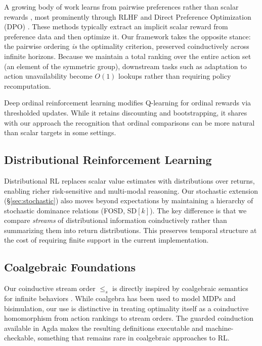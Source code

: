 \documentclass[runningheads]{llncs}
\begin{document}
A growing body of work learns from pairwise preferences rather than scalar rewards \cite{Wirth2017}, most prominently through RLHF and Direct Preference Optimization (DPO) \cite{Rafailov2023}.  These methods typically extract an implicit scalar reward from preference data and then optimize it.  Our framework takes the opposite stance: the pairwise ordering \emph{is} the optimality criterion, preserved coinductively across infinite horizons.  Because we maintain a total ranking over the entire action set (an element of the symmetric group), downstream tasks such as adaptation to action unavailability become $O(1)$ lookups rather than requiring policy recomputation.

Deep ordinal reinforcement learning \cite{Zap2019} modifies Q-learning for ordinal rewards via thresholded updates.  While it retains discounting and bootstrapping, it shares with our approach the recognition that ordinal comparisons can be more natural than scalar targets in some settings.

\subsection{Distributional Reinforcement Learning}

Distributional RL \cite{Bellemare2017,Dabney2018} replaces scalar value estimates with distributions over returns, enabling richer risk-sensitive and multi-modal reasoning.  Our stochastic extension (\S\ref{sec:stochastic}) also moves beyond expectations by maintaining a hierarchy of stochastic dominance relations (FOSD, SD$[k]$).  The key difference is that we compare \emph{streams} of distributional information coinductively rather than summarizing them into return distributions.  This preserves temporal structure at the cost of requiring finite support in the current implementation.

\subsection{Coalgebraic Foundations}

Our coinductive stream order $\le_s$ is directly inspired by coalgebraic semantics for infinite behaviors \cite{Rutten2000}.  While coalgebra has been used to model MDPs and bisimulation, our use is distinctive in treating optimality itself as a coinductive homomorphism from action rankings to stream orders.  The guarded coinduction available in Agda makes the resulting definitions executable and machine-checkable, something that remains rare in coalgebraic approaches to RL.
\end{document}
